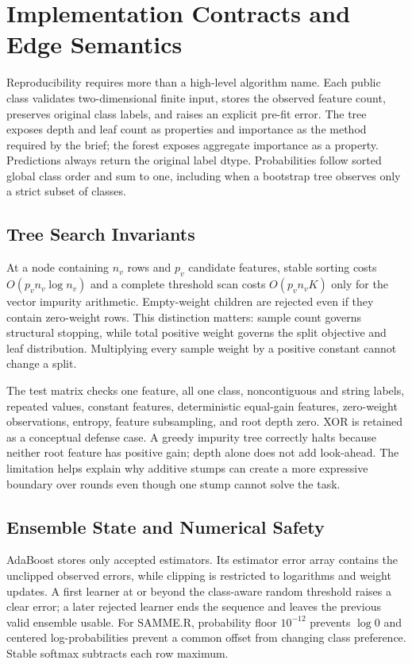 \documentclass[conference]{IEEEtran}
\begin{document}
\setcounter{page}{5}
\setcounter{section}{7}
\setcounter{equation}{10}
\setcounter{figure}{4}
\setcounter{table}{5}

\section{Implementation Contracts and Edge Semantics}
Reproducibility requires more than a high-level algorithm name. Each public
class validates two-dimensional finite input, stores the observed feature
count, preserves original class labels, and raises an explicit pre-fit error.
The tree exposes depth and leaf count as properties and importance as the
method required by the brief; the forest exposes aggregate importance as a
property. Predictions always return the original label dtype. Probabilities
follow sorted global class order and sum to one, including when a bootstrap
tree observes only a strict subset of classes.

\subsection{Tree Search Invariants}
At a node containing $n_v$ rows and $p_v$ candidate features, stable sorting
costs $O(p_v n_v\log n_v)$ and a complete threshold scan costs
$O(p_v n_v K)$ only for the vector impurity arithmetic. Empty-weight children
are rejected even if they contain zero-weight rows. This distinction matters:
sample count governs structural stopping, while total positive weight governs
the split objective and leaf distribution. Multiplying every sample weight by
a positive constant cannot change a split.

The test matrix checks one feature, all one class, noncontiguous and string
labels, repeated values, constant features, deterministic equal-gain features,
zero-weight observations, entropy, feature subsampling, and root depth zero.
XOR is retained as a conceptual defense case. A greedy impurity tree correctly
halts because neither root feature has positive gain; depth alone does not add
look-ahead. The limitation helps explain why additive stumps can create a more
expressive boundary over rounds even though one stump cannot solve the task.

\subsection{Ensemble State and Numerical Safety}
AdaBoost stores only accepted estimators. Its estimator error array contains
the unclipped observed errors, while clipping is restricted to logarithms and
weight updates. A first learner at or beyond the class-aware random threshold
raises a clear error; a later rejected learner ends the sequence and leaves the
previous valid ensemble usable. For SAMME.R, probability floor
$10^{-12}$ prevents $\log 0$ and centered log-probabilities prevent a common
offset from changing class preference. Stable softmax subtracts each row
maximum.
\end{document}
